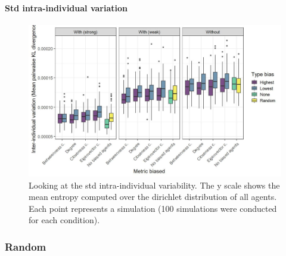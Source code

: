 \documentclass[
]{article}
\begin{document}
\hypertarget{std-intra-individual-variation-1}{%
\paragraph{Std intra-individual
variation}\label{std-intra-individual-variation-1}}

\begin{figure}[!H]

{\centering \includegraphics{./Figures/unnamed-chunk-202-1} 

}

\caption{Looking at the std intra-individual variability. The y scale shows the mean entropy computed over the dirichlet distribution of all agents. Each point represents a simulation (100 simulations were conducted for each condition).}\label{fig:unnamed-chunk-202}
\end{figure}

\hypertarget{random}{%
\subsubsection{Random}\label{random}}
\end{document}
